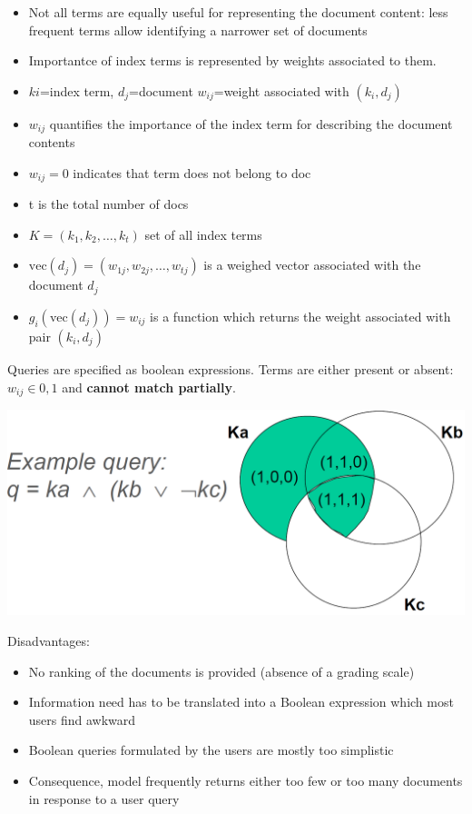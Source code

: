\begin{breakbox}

\begin{itemize}
	\item Not all terms are equally useful for representing the document content: less frequent terms allow identifying a narrower set of documents
	\item Importantce of index terms is represented by weights associated to them.
	\item $ki$=index term, $d_j$=document $w_{ij}$=weight associated with $(k_i,d_j)$
	\item $w_{ij}$ quantifies the importance of the index term for describing the document contents
	\item $w_{ij}=0$ indicates that term does not belong to doc
	\item t is the total number of docs
	\item $K=(k_1,k_2, \ldots, k_t)$ set of all index terms
	\item $\text{vec}(d_j) = (w_{1j}, w_{2j}, \ldots, w_{tj})$ is a weighed vector associated with the document $d_j$
	\item $g_i(\text{vec}(d_j)) = w_{ij}$ is a function which returns the weight associated with pair $(k_i, d_j)$
\end{itemize}
\end{breakbox}

\begin{breakbox}

Queries are specified as boolean expressions. Terms are either present or absent: $w_{ij} \in {0,1}$ and \textbf{cannot match partially}.

\begin{center}
	\includegraphics[width=.1\textwidth]{slides_images/boolean_model_example}
\end{center}

Disadvantages:
\begin{itemize}
	\item No ranking of the documents is provided (absence of a grading scale)
	\item Information need has to be translated into a
Boolean expression which most users find awkward
	\item Boolean queries formulated by the users are mostly too simplistic
	\item Consequence, model frequently returns either too few or too many documents in response to a user query
\end{itemize}
\end{breakbox}

